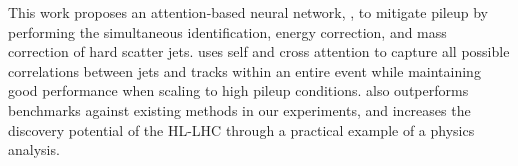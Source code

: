 This work proposes an attention-based neural network, \myname{}, to mitigate pileup by performing the simultaneous identification, energy correction, and mass correction of hard scatter jets. \myname{} uses self and cross attention to capture all possible correlations between jets and tracks within an entire event while maintaining good performance when scaling to high pileup conditions. \myname{} also outperforms benchmarks against existing methods in our experiments, and increases the discovery potential of the HL-LHC through a practical example of a physics analysis.




 




